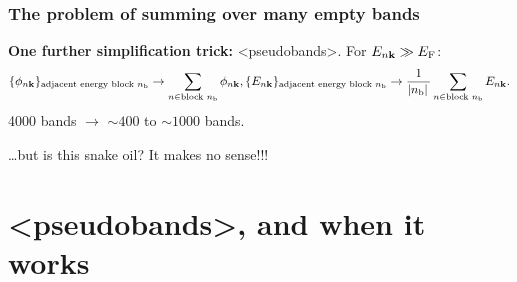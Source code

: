 \documentclass[t]{beamer}
\newcommand{\shortcode}[1]{\texttt{#1}}
\def\\{}%
\def\texttt#1{<#1>}%
\begin{document}
\begin{frame}
\frametitle{The problem of summing over many empty bands}


\textbf{One further simplification trick:} \shortcode{pseudobands}. 
For $E_{n \vb{k}} \gg E_{\text{F}}$:
\[
    \begin{aligned}
        \{ \phi_{n \vb{k}} \}_{\text{adjacent energy block $n_{\text{b}}$}} 
        \rightarrow \sum_{n \in \text{block $n_{\text{b}}$}} \phi_{n \vb{k}}, \\
        \{ E_{n \vb{k}} \}_{\text{adjacent energy block $n_{\text{b}}$}} \rightarrow
        \frac{1}{\abs*{n_{\text{b}}}}  \sum_{n \in \text{block $n_{\text{b}}$}} E_{n \vb{k}}.
    \end{aligned}
\]
4000 bands $\to$ $\sim 400$ to $\sim 1000$ bands.

\vspace{1cm}

\dots but is this snake oil? It makes no sense!!!

\end{frame}

\section{\shortcode{pseudobands}, and when it works}
\end{document}
